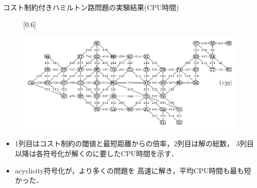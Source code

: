 \documentclass[dvipdfmx,10pt]{beamer}
\begin{document}
\begin{frame}{コスト制約付きハミルトン路問題の実験結果(CPU時間)}

\begin{figure}[h]
  \def\@captype{table}
  \begin{minipage}[c]{.48\textwidth}
    \begin{center}
      \scalebox{0.6}[0.6]{
        
      }
    \end{center}

  \end{minipage}
  \hfill
  \begin{minipage}[c]{.48\textwidth}
    \centering
    \includegraphics[width=0.9\linewidth]{fig/taocp_vol4fasc1b_p52_eq133.pdf}
  \end{minipage}
\end{figure}
  

\begin{itemize}
\item 1列目はコスト制約の閾値と最短距離からの倍率，2列目は解の総数，
  3列目以降は各符号化が解くのに要したCPU時間を示す．
\item \textsf{acyclicity}符号化が，より多くの問題を
  高速に解き，平均CPU時間も最も短かった．
\end{itemize}
    
\end{frame}
\end{document}
